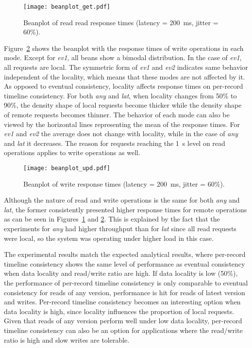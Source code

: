\documentclass[man,floatsintext,12pt]{apa6}
\begin{document}
\begin{figure}[h!]
\caption{Beanplot of read read response times (latency = 200~ms, jitter = 60\%).}
\texttt{[image: beanplot\_get.pdf]}
\label{fig:beanplot_get}
\end{figure}

Figure~\ref{fig:beanplot_upd} shows the beanplot with the response times of
write operations in each mode. Except for \textit{ev1}, all beans show a
bimodal distribution. In the case of \textit{ev1}, all requests are local. The
symmetric form of \textit{ev1} and \textit{ev2} indicates same behavior
independent of the locality, which means that these modes are not affected by
it. As opposed to eventual consistency, locality affects response times on
per-record timeline consistency. For both \textit{any} and \textit{lat}, when
locality changes from 50\% to 90\%, the density shape of local requests become
thicker while the density shape of remote requests becomes thinner. The
behavior of each mode can also be viewed by the horizontal lines representing
the mean of the response times. For \textit{ev1} and \textit{ev2} the average
does not change with locality, while in the case of \textit{any} and
\textit{lat} it decreases. The reason for requests reaching the 1~s level on
read operations applies to write operations as well.

\begin{figure}[h!]
\caption{Beanplot of write response times (latency = 200~ms, jitter = 60\%).}
\texttt{[image: beanplot\_upd.pdf]}
\label{fig:beanplot_upd}
\end{figure}

Although the nature of read and write operations is the same for both
\textit{any} and \textit{lat}, the former consistently presented higher
response times for remote operations as can be seen in
Figures~\ref{fig:beanplot_get} and \ref{fig:beanplot_upd}. This is explained by
the fact that the experiments for \textit{any} had higher throughput than for
\textit{lat} since all read requests were local, so the system was operating
under higher load in this case.

The experimental results match the expected analytical results, where
per-record timeline consistency shows the same level of performance as eventual
consistency when data locality and read/write ratio are high.  If data locality
is low (50\%), the performance of per-record timeline consistency is only
comparable to eventual consistency for reads of any version, performance is hit
for reads of latest version and writes. Per-record timeline consistency
becomes an interesting option when data locality is high, since locality
influences the proportion of local requests. Given that reads of any version
perform well under low data locality, per-record timeline consistency can also
be an option for applications where the read/write ratio is high and slow
writes are tolerable.
\end{document}
